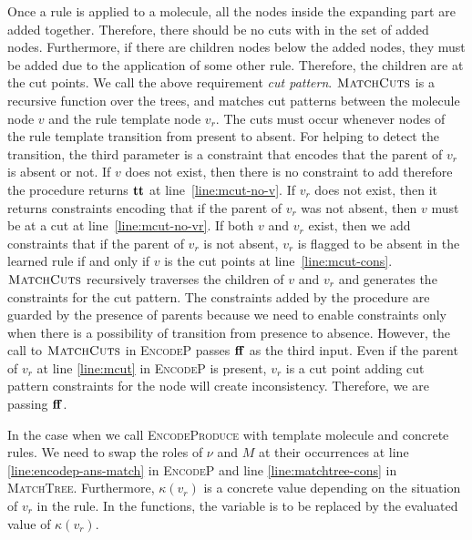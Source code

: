 Once a rule is applied to a molecule, all the
nodes inside the expanding part are added together.
Therefore, there should be no cuts with in the set of added nodes.
Furthermore, if there are children nodes below the added nodes,
they must be added due to the application of some other rule.
Therefore, the children are at the cut points.
We call the above requirement {\em cut pattern}. 
$\textsc{MatchCuts}$ is a recursive function over the trees, and matches
cut patterns between the molecule node $v$ and the rule template node $v_r$.
The cuts must occur whenever nodes of the rule template transition
from present to absent.
For helping to detect the transition,
the third parameter is a constraint that encodes that the parent of $v_r$
is absent or not.
If $v$ does not exist, then there is no constraint to add therefore
the procedure returns $\mathbf{tt}$ at line~\ref{line:mcut-no-v}.
If $v_r$ does not exist, then it returns constraints encoding
that if the parent of $v_r$ was not absent, then $v$ must be at a cut at line~\ref{line:mcut-no-vr}.
If both $v$ and $v_r$ exist, then we add constraints
that if the parent of $v_r$ is not absent, $v_r$ is
flagged to be absent in the learned rule
if and only if $v$ is the cut points at line~\ref{line:mcut-cons}.
$\textsc{MatchCuts}$ recursively traverses the children of $v$ and $v_r$
and generates the constraints for the cut pattern.
The constraints added by the procedure are guarded by the presence of parents
because we need to enable constraints only when there is a possibility of transition
from presence to absence.
However, the call to $\textsc{MatchCuts}$ in \textsc{EncodeP} passes $\mathbf{ff}$ as the third input.
Even if the parent of $v_r$ at line \ref{line:mcut} in \textsc{EncodeP} is present,
$v_r$ is a cut point adding cut pattern constraints for the node will create inconsistency.
Therefore, we are passing $\mathbf{ff}$.

In the case when we call \textsc{EncodeProduce} with template molecule and
concrete rules.
We need to swap the roles of $\nu$ and $M$ at their occurrences
at line \ref{line:encodep-ans-match} in \textsc{EncodeP} and
line \ref{line:matchtree-cons} in \textsc{MatchTree}.
Furthermore, $\kappa(v_r)$ is a concrete value depending on the situation of $v_r$ in
the rule.
In the functions, the variable is to be replaced by the
evaluated value of $\kappa(v_r)$.






